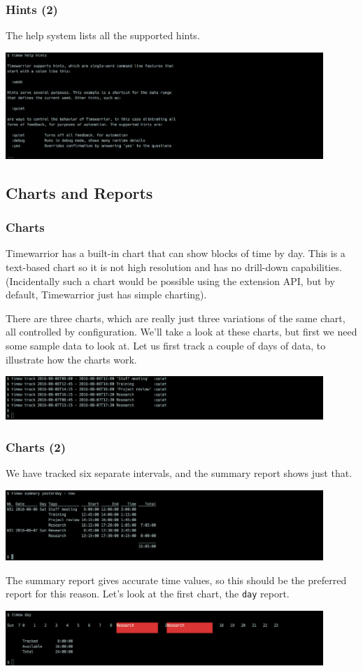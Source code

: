 \documentclass[t,handout]{beamer}
\begin{document}
\begin{frame}[fragile]\frametitle{Hints (2)}
    The help system lists all the supported hints.

    \includegraphics[width=12cm]{images/tutorial23.png}
\end{frame}

\subsection{Charts and Reports}

\begin{frame}[fragile]\frametitle{Charts}
    Timewarrior has a built-in chart that can show blocks of time by day. This is a text-based chart so it is not high resolution and has no drill-down capabilities. (Incidentally such a chart would be possible using the extension API, but by default, Timewarrior just has simple charting).

    There are three charts, which are really just three variations of the same chart, all controlled by configuration. We'll take a look at these charts, but first we need some sample data to look at.  Let us first track a couple of days of data, to illustrate how the charts work.

    \includegraphics[width=12cm]{images/tutorial24.png}
\end{frame}

\begin{frame}[fragile]\frametitle{Charts (2)}
    We have tracked six separate intervals, and the summary report shows just that.

    \includegraphics[width=12cm]{images/tutorial25.png}

    The summary report gives accurate time values, so this should be the preferred report for this reason. Let's look at the first chart, the \verb=day= report.

    \includegraphics[width=12cm]{images/tutorial26.png}
\end{frame}
\end{document}
